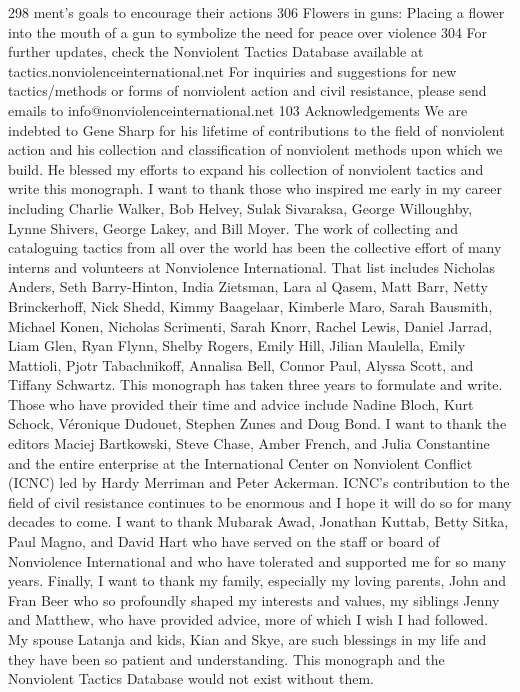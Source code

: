 \documentclass[twoside,a4paper,12pt,fleqn,openany]{extbook}
\begin{document}
 298
 ment’s goals to encourage their actions 306
Flowers in guns: Placing a flower into the
mouth of a gun to symbolize the need for
peace over violence
 304
For further updates, check the Nonviolent Tactics Database available at
tactics.nonviolenceinternational.net
For inquiries and suggestions for new tactics/methods or forms of nonviolent action
and civil resistance, please send emails to info@nonviolenceinternational.net
103
Acknowledgements
We are indebted to Gene Sharp for his lifetime of contributions to the field of nonviolent action and his
collection and classification of nonviolent methods upon which we build. He blessed my efforts to expand
his collection of nonviolent tactics and write this monograph.
I want to thank those who inspired me early in my career including Charlie Walker, Bob Helvey, Sulak Sivaraksa,
George Willoughby, Lynne Shivers, George Lakey, and Bill Moyer.
The work of collecting and cataloguing tactics from all over the world has been the collective effort of many
interns and volunteers at Nonviolence International.
That list includes Nicholas Anders, Seth Barry-Hinton, India Zietsman, Lara al Qasem, Matt Barr, Netty Brinckerhoff,
Nick Shedd, Kimmy Baagelaar, Kimberle Maro, Sarah Bausmith, Michael Konen, Nicholas Scrimenti, Sarah Knorr,
Rachel Lewis, Daniel Jarrad, Liam Glen, Ryan Flynn, Shelby Rogers, Emily Hill, Jilian Maulella, Emily Mattioli, Pjotr
Tabachnikoff, Annalisa Bell, Connor Paul, Alyssa Scott, and Tiffany Schwartz.
This monograph has taken three years to formulate and write. Those who have provided their time and advice
include Nadine Bloch, Kurt Schock, Véronique Dudouet, Stephen Zunes and Doug Bond.
I want to thank the editors Maciej Bartkowski, Steve Chase, Amber French, and Julia Constantine and the entire
enterprise at the International Center on Nonviolent Conflict (ICNC) led by Hardy Merriman and Peter Ackerman.
ICNC’s contribution to the field of civil resistance continues to be enormous and I hope it will do so for many
decades to come.
I want to thank Mubarak Awad, Jonathan Kuttab, Betty Sitka, Paul Magno, and David Hart who have served on
the staff or board of Nonviolence International and who have tolerated and supported me for so many years.
Finally, I want to thank my family, especially my loving parents, John and Fran Beer who so profoundly shaped
my interests and values, my siblings Jenny and Matthew, who have provided advice, more of which I wish I had
followed. My spouse Latanja and kids, Kian and Skye, are such blessings in my life and they have been so
patient and understanding. This monograph and the Nonviolent Tactics Database would not exist without them.
\end{document}
